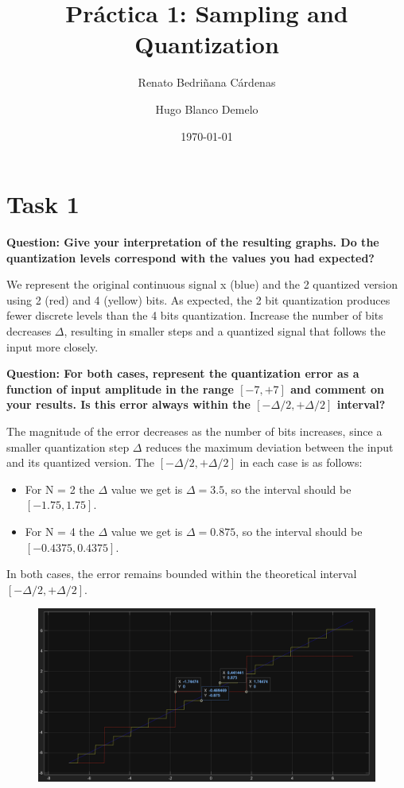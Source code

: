 \documentclass[11pt,a4paper]{article}
\title{\vspace{-1.5cm}\Large\textbf{Práctica 1: Sampling and Quantization}}
\author{\normalsize Renato Bedriñana Cárdenas \and \normalsize Hugo Blanco Demelo}
\date{\normalsize\today}
\begin{document}
\maketitle
\section{Task 1}
\textbf{Question: Give your interpretation of the resulting graphs. Do the quantization levels correspond with the values you had expected?}

\vspace{0.5cm}
We represent the original continuous signal x (blue) and the 2 quantized version using 2 (red) and 4 (yellow) bits. As expected, the 2 bit quantization produces fewer discrete levels than the 4 bits quantization. Increase the number of bits decreases $\Delta$, resulting in smaller steps and a quantized signal that follows the input more closely.

\vspace{1cm}
\textbf{Question: For both cases, represent the quantization error as a function of input amplitude in the range $[-7, +7]$ and comment on your results. Is this error always within the $[-\Delta /2, +\Delta /2]$ interval?}

\vspace{0.5cm}
The magnitude of the error decreases as the number of bits increases, since a smaller quantization step
$\Delta$ reduces the maximum deviation between the input and its quantized version.
The $[-\Delta /2, +\Delta /2]$ in each case is as follows:
\begin{itemize}
    \item For N = 2 the $\Delta$ value we get is $\Delta = 3.5$, so the interval should be $[-1.75, 1.75]$.
    \item For N = 4 the $\Delta$ value we get is $\Delta = 0.875$, so the interval should be $[-0.4375, 0.4375]$.
\end{itemize}
In both cases, the error remains bounded within the theoretical interval $[-\Delta /2, +\Delta /2]$.

\begin{figure}[H]  %
    \centering
    \includegraphics[width=1\textwidth]{img/task1_2.png}
    \label{fig:task1_2}
\end{figure}
\end{document}
